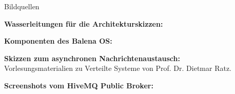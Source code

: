 {\begin{frame}[allowframebreaks]{Bildquellen}
        \begin{minipage}{\textwidth}
            \textbf{Wasserleitungen für die Architekturskizzen:} \\
        \end{minipage}
        \medskip

        \begin{minipage}{\textwidth}
            \textbf{Komponenten des Balena OS:} \\
        \end{minipage}
        \medskip

        \begin{minipage}{\textwidth}
            \textbf{Skizzen zum asynchronen Nachrichtenaustausch:} \\
            Vorlesungsmaterialien zu Verteilte Systeme von Prof. Dr. Dietmar Ratz.
        \end{minipage}
        \medskip

        \begin{minipage}{\textwidth}
            \textbf{Screenshots vom HiveMQ Public Broker:} \\
        \end{minipage}
        \medskip
    \end{frame}
}
